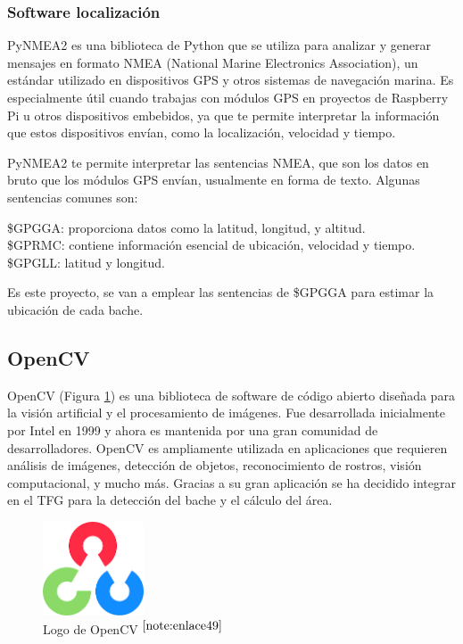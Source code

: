 \subsubsection{Software localización}

PyNMEA2 es una biblioteca de Python que se utiliza para analizar y generar mensajes en formato NMEA (National Marine Electronics Association), un estándar utilizado en dispositivos GPS y otros sistemas de navegación marina. Es especialmente útil cuando trabajas con módulos GPS en proyectos de Raspberry Pi u otros dispositivos embebidos, ya que te permite interpretar la información que estos dispositivos envían, como la localización, velocidad y tiempo.

PyNMEA2 te permite interpretar las sentencias NMEA, que son los datos en bruto que los módulos GPS envían, usualmente en forma de texto. Algunas sentencias comunes son:

\$GPGGA: proporciona datos como la latitud, longitud, y altitud.\\
\$GPRMC: contiene información esencial de ubicación, velocidad y tiempo.\\
\$GPGLL: latitud y longitud.

Es este proyecto, se van a emplear las sentencias de \$GPGGA para estimar la ubicación de cada bache.

\subsection{OpenCV}

OpenCV (Figura \ref{fig:opencv}) es una biblioteca de software de código abierto diseñada para la visión artificial y el procesamiento de imágenes. Fue desarrollada inicialmente por Intel en 1999 y ahora es mantenida por una gran comunidad de desarrolladores. OpenCV es ampliamente utilizada en aplicaciones que requieren análisis de imágenes, detección de objetos, reconocimiento de rostros, visión computacional, y mucho más. Gracias a su gran aplicación se ha decidido integrar en el TFG para la detección del bache y el cálculo del área.

\begin{figure} [h!]
	\begin{center}
		\includegraphics[width=3cm]{figs/opencv.png}
	\end{center}
	\caption{Logo de OpenCV $^{\ref{note:enlace49}}$} 
	\label{fig:opencv}
\end{figure}\

